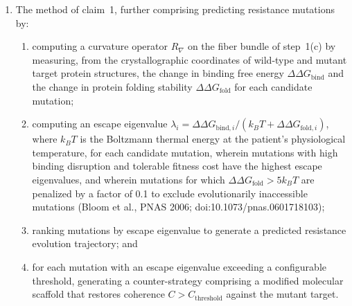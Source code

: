 \documentclass[11pt]{article}
\begin{document}
\begin{enumerate}[label=\textbf{\arabic*.}, leftmargin=*, itemsep=1em]
\begin{enumerate}[label=(\alph*)]
    wherein $K_{\text{exc}}$ is a function of the measured estimated glomerular filtration rate
    and $K_{\text{tox}}$ includes an interaction term derived from the measured concurrent drug
    trough level;
    \item jointly optimizing a coherence score $C = \tau/K$ to select, from a plurality of
    candidate molecules, the therapeutic molecule that maximizes topological fit to the target
    while minimizing patient-specific safety curvature, subject to a therapeutic window
    constraint $E + T^2 \leq 1$; and
    \item generating a dosing protocol comprising a drug identity, a dose quantity in
    milligrams, an administration route, and an administration interval in hours, each computed
    from the coherence optimization of step~(f) and the patient-specific ADMET curvature of
    step~(e).
\end{enumerate}

\item The method of claim~1, further comprising predicting resistance mutations by:
\begin{enumerate}[label=(\alph*)]
    \item computing a curvature operator $R_\nabla$ on the fiber bundle of step~1(c) by
    measuring, from the crystallographic coordinates of wild-type and mutant target protein
    structures, the change in binding free energy $\Delta\Delta G_{\text{bind}}$ and the change
    in protein folding stability $\Delta\Delta G_{\text{fold}}$ for each candidate mutation;
    \item computing an escape eigenvalue $\lambda_i = \Delta\Delta G_{\text{bind},i} /
    (k_BT + \Delta\Delta G_{\text{fold},i})$, where $k_BT$ is the Boltzmann thermal energy
    at the patient's physiological temperature, for each candidate mutation, wherein mutations
    with high binding disruption and tolerable fitness cost have the highest escape eigenvalues,
    and wherein mutations for which $\Delta\Delta G_{\text{fold}} > 5k_BT$ are penalized by a
    factor of 0.1 to exclude evolutionarily inaccessible mutations (Bloom et al., PNAS 2006;
    doi:10.1073/pnas.0601718103);
    \item ranking mutations by escape eigenvalue to generate a predicted resistance evolution
    trajectory; and
    \item for each mutation with an escape eigenvalue exceeding a configurable threshold,
    generating a counter-strategy comprising a modified molecular scaffold that restores
    coherence $C > C_{\text{threshold}}$ against the mutant target.
\end{enumerate}


\end{enumerate}
\end{document}
